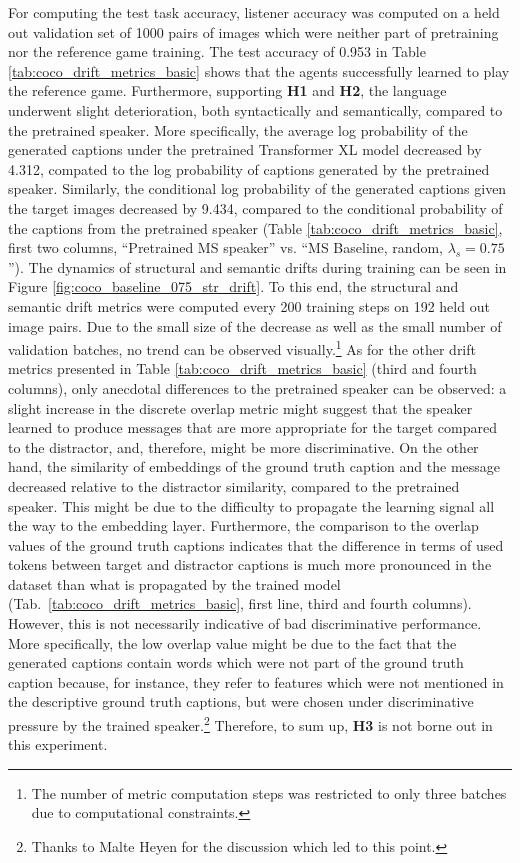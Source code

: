 For computing the test task accuracy, listener accuracy was computed on a held out validation set of 1000 pairs of images which were neither part of pretraining nor the reference game training. The test accuracy of 0.953 in Table \ref{tab:coco_drift_metrics_basic} shows that the agents successfully learned to play the reference game. Furthermore, supporting \textbf{H1} and \textbf{H2}, the language underwent slight deterioration, both syntactically and semantically, compared to the pretrained speaker. More specifically, the average log probability of the generated captions under the pretrained Transformer XL model decreased by 4.312, compated to the log probability of captions generated by the pretrained speaker. Similarly, the conditional log probability of the generated captions given the target images decreased by 9.434, compared to the conditional probability of the captions from the pretrained speaker (Table \ref{tab:coco_drift_metrics_basic}, first two columns, ``Pretrained MS speaker'' vs. ``MS Baseline, random, $\lambda_s=0.75$''). The dynamics of structural and semantic drifts during training can be seen in Figure \ref{fig:coco_baseline_075_str_drift}. To this end, the structural and semantic drift metrics were computed every 200 training steps on 192 held out image pairs. Due to the small size of the decrease as well as the small number of validation batches, no trend can be observed visually.\footnote{The number of metric computation steps was restricted to only three batches due to computational constraints.} 
As for the other drift metrics presented in Table \ref{tab:coco_drift_metrics_basic} (third and fourth columns), only anecdotal differences to the pretrained speaker can be observed: a slight increase in the discrete overlap metric might suggest that the speaker learned to produce messages that are more appropriate for the target compared to the distractor, and, therefore, might be more discriminative. On the other hand, the similarity of embeddings of the ground truth caption and the message decreased relative to the distractor similarity, compared to the pretrained speaker. This might be due to the difficulty to propagate the learning signal all the way to the embedding layer. Furthermore, the comparison to the overlap values of the ground truth captions indicates that the difference in terms of used tokens between target and distractor captions is much more pronounced in the dataset than what is propagated by the trained model (Tab.~\ref{tab:coco_drift_metrics_basic}, first line, third and fourth columns).  However, this is not necessarily indicative of bad discriminative performance. More specifically, the low overlap value might be due to the fact that the generated captions contain words which were not part of the ground truth caption because, for instance, they refer to features which were not mentioned in the descriptive ground truth captions, but were chosen under discriminative pressure by the trained speaker.\footnote{Thanks to Malte Heyen for the discussion which led to this point.} 
Therefore, to sum up, \textbf{H3} is not borne out in this experiment.

